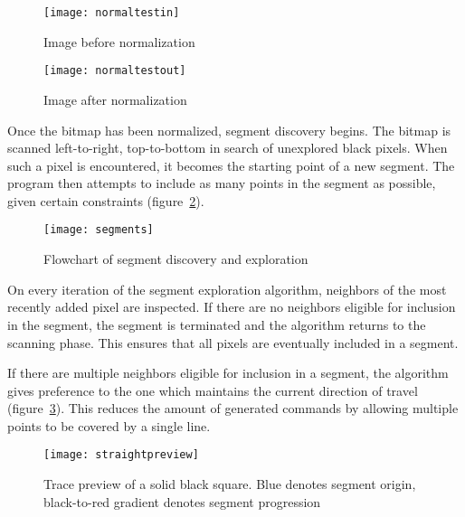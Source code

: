 \clearpage
\begin{figure}[ht]
    \centering
    \begin{minipage}{0.5\textwidth}
        \centering
        \texttt{[image: normaltestin]}
        \caption{Image before normalization}
    \end{minipage}\hfill
    \begin{minipage}{0.5\textwidth}
        \centering
        \texttt{[image: normaltestout]}
        \caption{Image after normalization}
        \label{normalize}
    \end{minipage}
\end{figure}

Once the bitmap has been normalized, segment discovery begins. The bitmap is
scanned left-to-right, top-to-bottom in search of unexplored black pixels.
When such a pixel is encountered, it becomes the starting point of a new
segment. The program then attempts to include as many points in the segment as
possible, given certain constraints (figure~\ref{segments}).

\begin{figure}[ht]
    \begin{center}
        \texttt{[image: segments]}
        \caption{Flowchart of segment discovery and exploration}
        \label{segments}
    \end{center}
\end{figure}

On every iteration of the segment exploration algorithm, neighbors of the most
recently added pixel are inspected. If there are no neighbors eligible for
inclusion in the segment, the segment is terminated and the algorithm returns
to the scanning phase. This ensures that all pixels are eventually included in
a segment.

If there are multiple neighbors eligible for inclusion in a segment, the
algorithm gives preference to the one which maintains the current direction of
travel (figure~\ref{straight}). This reduces the amount of generated commands
by allowing multiple points to be covered by a single line.

\begin{figure}[ht]
    \begin{center}
        \texttt{[image: straightpreview]}
        \caption{Trace preview of a solid black square. Blue denotes segment
        origin, black-to-red gradient denotes segment progression}
        \label{straight}
    \end{center}
\end{figure}


